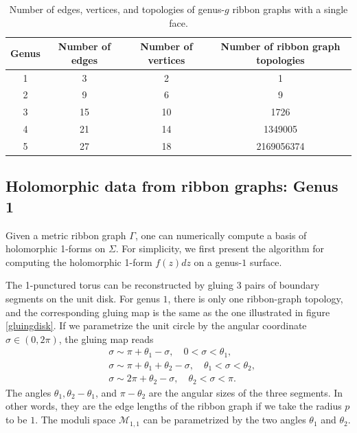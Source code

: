 \documentclass[12pt]{article}
\def\ie{\begin{equation}\begin{aligned}}
\def\fe{\end{aligned}\end{equation}}
\numberwithin{equation}{section}
\begin{document}
\begin{table}
\begin{center}
\begin{tabular}{cccc}
\hline
Genus & Number of edges & Number of vertices & Number of ribbon graph topologies \\ \hline
1     & 3 & 2 & 1                                 \\
2     & 9 & 6 & 9                                 \\
3     & 15 & 10 & 1726                              \\
4     & 21 & 14 & 1349005                           \\
5     & 27 & 18 & 2169056374                        \\ \hline
\end{tabular}
\end{center}
\caption{Number of edges, vertices, and topologies of genus-$g$ ribbon graphs with a single face.}
\label{topologynumber}
\end{table}

\subsection{Holomorphic data from ribbon graphs: Genus 1}

Given a metric ribbon graph $\Gamma$, one can numerically compute a basis of holomorphic 1-forms on $\Sigma$. For simplicity, we first present the algorithm for computing the holomorphic 1-form $f(z)dz$ on a genus-$1$ surface.

The 1-punctured torus can be reconstructed by gluing 3 pairs of boundary segments on the unit disk. For genus $1$, there is only one ribbon-graph topology, and the corresponding gluing map is the same as the one illustrated in figure \ref{gluingdisk}. If we parametrize the unit circle by the angular coordinate $\sigma \in (0,2\pi)$, the gluing map reads
\ie
&\sigma \sim \pi + \theta_1 - \sigma, \quad 0<\sigma<\theta_1,\\
&\sigma \sim \pi + \theta_1 + \theta_2 - \sigma, \quad \theta_1 <\sigma<\theta_2,\\
&\sigma \sim 2\pi + \theta_2 - \sigma,\quad \theta_2 < \sigma < \pi.
\label{gluinggenus1}
\fe
The angles $\theta_{1}, \theta_2-\theta_1$, and $\pi-\theta_2$ are the angular sizes of the three segments. In other words, they are the edge lengths of the ribbon graph if we take the radius $p$ to be $1$. The moduli space $\mathcal{M}_{1,1}$ can be parametrized by the two angles $\theta_1$ and $\theta_2$.
\end{document}
